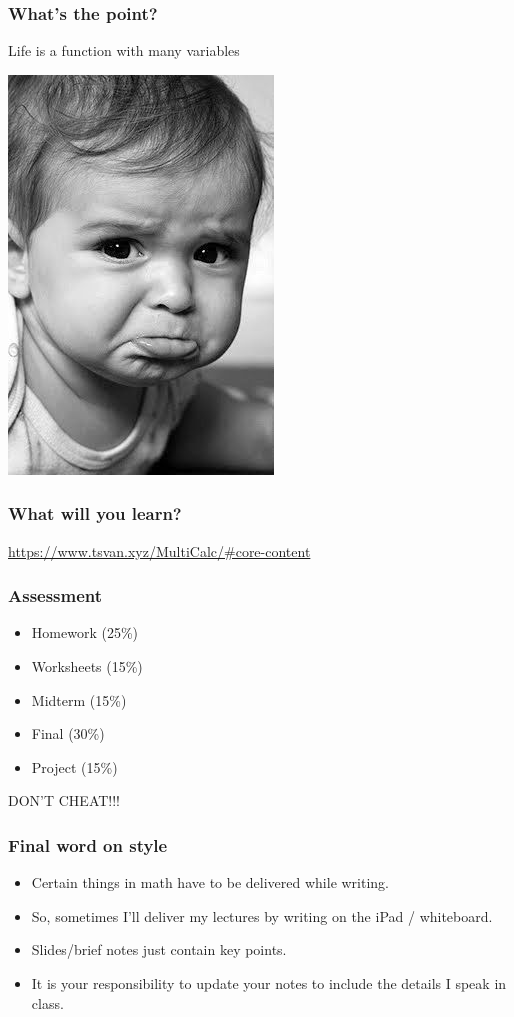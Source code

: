 \documentclass[aspectratio=169]{beamer}
\begin{document}
\begin{frame}
    \frametitle{What's the point?}
    Life is a function with many variables \pause

    \centering
    \includegraphics[height=0.5\textheight]{sad}
\end{frame}

\begin{frame}
    \frametitle{What will you learn?}
    \url{https://www.tsvan.xyz/MultiCalc/\#core-content}
\end{frame}


\begin{frame}
    \frametitle{Assessment}
    \begin{itemize}
        \item Homework (25\%)
        \item Worksheets (15\%)
        \item Midterm (15\%)
        \item Final (30\%)
        \item Project (15\%)
    \end{itemize}
\end{frame}

\begin{frame}
    \centering
    DON'T CHEAT!!!
\end{frame}

\begin{frame}
    \frametitle{Final word on style}
    \begin{itemize}
        \item Certain things in math have to be delivered while writing.
        \item So, sometimes I'll deliver my lectures by writing on the iPad / whiteboard.
        \item Slides/brief notes just contain key points.
        \item It is your responsibility to update your notes to include the details I speak in class.
    \end{itemize}



\end{frame}
\end{document}
